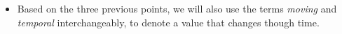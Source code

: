 \begin{itemize}
    \item Based on the three previous points, we will also use the terms \textit{moving} and \textit{temporal} interchangeably, to denote a value that changes though time.
\end{itemize}